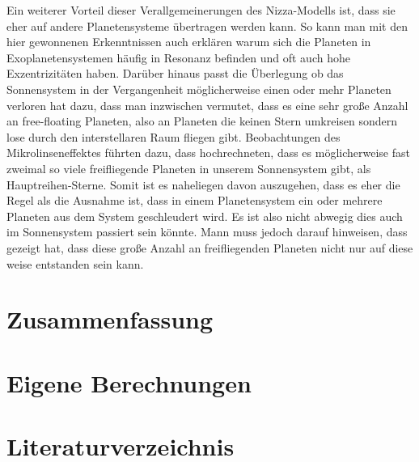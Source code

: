 \documentclass[12pt,a4paper,twoside]{article}
\begin{document}
Ein weiterer Vorteil dieser Verallgemeinerungen des Nizza-Modells ist, dass sie eher auf andere Planetensysteme übertragen werden kann. So kann man mit den hier gewonnenen Erkenntnissen auch erklären warum sich die Planeten in Exoplanetensystemen häufig in Resonanz befinden und oft auch hohe Exzentrizitäten haben\cite{Weidenschilling1996,Rasio1996,Marcy2001,Nesvorny2012}.
Darüber hinaus passt die Überlegung ob das Sonnensystem in der Vergangenheit möglicherweise einen oder mehr Planeten verloren hat dazu, dass man inzwischen vermutet, dass es eine sehr große Anzahl an free-floating Planeten, also an Planeten die keinen Stern umkreisen sondern lose durch den interstellaren Raum fliegen gibt. %
Beobachtungen des Mikrolinseneffektes führten dazu, dass \cite{Sumi2011} hochrechneten, dass es möglicherweise fast zweimal so viele freifliegende Planeten in unserem Sonnensystem gibt, als Hauptreihen-Sterne. %
Somit ist es naheliegen davon auszugehen, dass es eher die Regel als die Ausnahme ist, dass in einem Planetensystem ein oder mehrere Planeten aus dem System geschleudert wird. Es ist also nicht abwegig dies auch im Sonnensystem passiert sein könnte.
Mann muss jedoch darauf hinweisen, dass \cite{Veras2012} gezeigt hat, dass diese große Anzahl an freifliegenden Planeten nicht nur auf diese weise entstanden sein kann.

\section{Zusammenfassung}


\newpage
\renewcommand{\thesection}{\Alph{section}}
\setcounter{section}{0} %
\section{Eigene Berechnungen}
\section{Literaturverzeichnis}

{}

\end{document}
